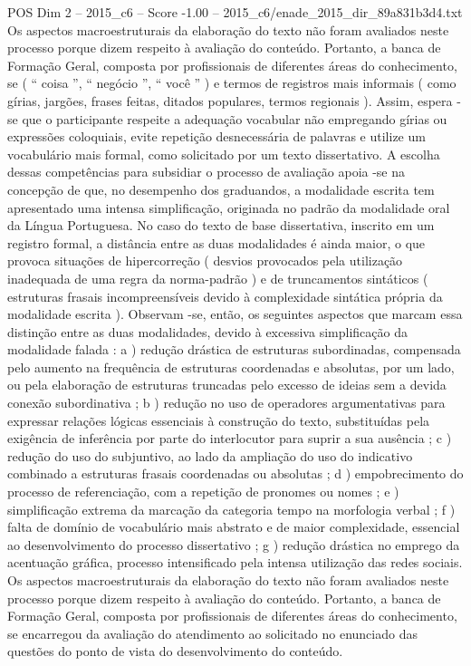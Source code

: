 \begin{textsample}{POS Dim 2 – 2015\_c6 – Score -1.00 – 2015\_c6/enade\_2015\_dir\_89a831b3d4.txt}
Os aspectos macroestruturais da elaboração do texto não foram avaliados neste processo porque dizem respeito à avaliação do conteúdo.
Portanto, a banca de Formação Geral, composta por profissionais de diferentes áreas do conhecimento, se ( “ coisa ”, “ negócio ”, “ você ” ) e termos de registros mais informais ( como gírias, jargões, frases feitas, ditados populares, termos regionais ).
Assim, espera -se que o participante respeite a adequação vocabular não empregando gírias ou expressões coloquiais, evite repetição desnecessária de palavras e utilize um vocabulário mais formal, como solicitado por um texto dissertativo.
A escolha dessas competências para subsidiar o processo de avaliação apoia -se na concepção de que, no desempenho dos graduandos, a modalidade escrita tem apresentado uma intensa simplificação, originada no padrão da modalidade oral da Língua Portuguesa.
No caso do texto de base dissertativa, inscrito em um registro formal, a distância entre as duas modalidades é ainda maior, o que provoca situações de hipercorreção ( desvios provocados pela utilização inadequada de uma regra da norma-padrão ) e de truncamentos sintáticos ( estruturas frasais incompreensíveis devido à complexidade sintática própria da modalidade escrita ).
Observam -se, então, os seguintes aspectos que marcam essa distinção entre as duas modalidades, devido à excessiva simplificação da modalidade falada : a ) redução drástica de estruturas subordinadas, compensada pelo aumento na frequência de estruturas coordenadas e absolutas, por um lado, ou pela elaboração de estruturas truncadas pelo excesso de ideias sem a devida conexão subordinativa ; b ) redução no uso de operadores argumentativas para expressar relações lógicas essenciais à construção do texto, substituídas pela exigência de inferência por parte do interlocutor para suprir a sua ausência ; c ) redução do uso do subjuntivo, ao lado da ampliação do uso do indicativo combinado a estruturas frasais coordenadas ou absolutas ; d ) empobrecimento do processo de referenciação, com a repetição de pronomes ou nomes ; e ) simplificação extrema da marcação da categoria tempo na morfologia verbal ; f ) falta de domínio de vocabulário mais abstrato e de maior complexidade, essencial ao desenvolvimento do processo dissertativo ; g ) redução drástica no emprego da acentuação gráfica, processo intensificado pela intensa utilização das redes sociais.
Os aspectos macroestruturais da elaboração do texto não foram avaliados neste processo porque dizem respeito à avaliação do conteúdo.
Portanto, a banca de Formação Geral, composta por profissionais de diferentes áreas do conhecimento, se encarregou da avaliação do atendimento ao solicitado no enunciado das questões do ponto de vista do desenvolvimento do conteúdo.

\end{textsample}
